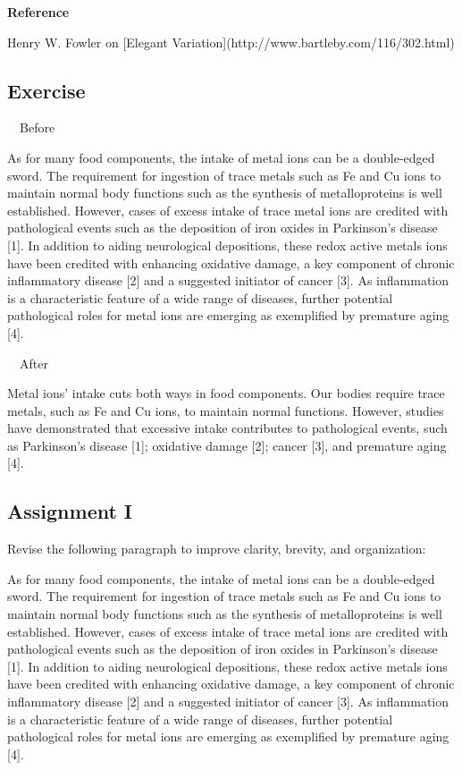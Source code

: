 \documentclass[a4paper, 12pt]{article}
\begin{document}
\textbf{Reference}
\par Henry W. Fowler on [Elegant Variation](http://www.bartleby.com/116/302.html)

\newpage\subsection{Exercise}

\par\ \textbullet\ Before
\par As for many food components, the intake of metal ions can be a double-edged sword.
The requirement for ingestion of trace metals such as Fe and Cu ions to maintain normal body functions such as the synthesis of metalloproteins is well established.
However, cases of excess intake of trace metal ions are credited with pathological events such as the deposition of iron oxides in Parkinson's disease [1].
In addition to aiding neurological depositions, these redox active metals ions have been credited with enhancing oxidative damage,
a key component of chronic inflammatory disease [2] and a suggested initiator of cancer [3]. As inflammation is a characteristic feature of a wide range of diseases,
further potential pathological roles for metal ions are emerging as exemplified by premature aging [4].

\par\ \textbullet\ After
\par Metal ions' intake cuts both ways in food components.
Our bodies require trace metals, such as Fe and Cu ions, to maintain normal functions.
However, studies have demonstrated that excessive intake contributes to pathological events,
such as Parkinson's disease [1]; oxidative damage [2]; cancer [3], and premature aging [4].

\newpage\subsection{Assignment I}

\par Revise the following paragraph to improve clarity, brevity, and organization:

\par As for many food components, the intake of metal ions can be a double-edged sword. 
The requirement for ingestion of trace metals such as Fe and Cu ions to maintain normal body functions such as the synthesis of metalloproteins is well established.
However, cases of excess intake of trace metal ions are credited with pathological events such as the deposition of iron oxides in Parkinson's disease [1].
In addition to aiding neurological depositions, these redox active metals ions have been credited with enhancing oxidative damage,
a key component of chronic inflammatory disease [2] and a suggested initiator of cancer [3]. As inflammation is a characteristic feature of a wide range of diseases,
further potential pathological roles for metal ions are emerging as exemplified by premature aging [4].
\end{document}
